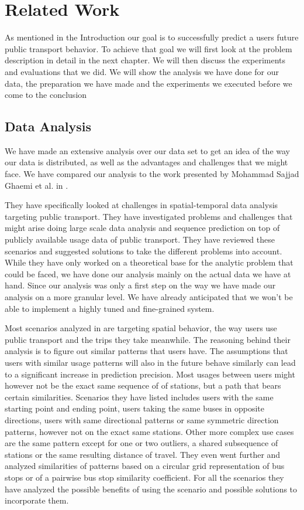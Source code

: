 \newpage
\chapter{Related Work}

As mentioned in the Introduction our goal is to successfully predict a users future public transport behavior. To achieve that goal we will first look at the problem description in detail in the next chapter. We will then discuss the experiments and evaluations that we did. We will show the analysis we have done for our data, the preparation we have made and the experiments we executed before we come to the conclusion

\section{Data Analysis}
We have made an extensive analysis over our data set to get an idea of the way our data is distributed, as well as the advantages and challenges that we might face. We have compared our analysis to the work presented by Mohammad Sajjad Ghaemi et al. in \cite{RelatedWorkDataAnalysis}. 

They have specifically looked at challenges in spatial-temporal data analysis targeting public transport. They have investigated problems and challenges that might arise doing large scale data analysis and sequence prediction on top of publicly available usage data of public transport. They have reviewed these scenarios and suggested solutions to take the different problems into account. While they have only worked on a theoretical base for the analytic problem that could be faced, we have done our analysis mainly on the actual data we have at hand. Since our analysis was only a first step on the way we have made our analysis on a more granular level. We have already anticipated that we won't be able to implement a highly tuned and fine-grained system. 

Most scenarios analyzed in \cite{RelatedWorkDataAnalysis} are targeting spatial behavior, the way users use public transport and the trips they take meanwhile. The reasoning behind their analysis is to figure out similar patterns that users have. The assumptions that users with similar usage patterns will also in the future behave similarly can lead to a significant increase in prediction precision. Most usages between users might however not be the exact same sequence of of stations, but a path that bears certain similarities. Scenarios they have listed includes users with the same starting point and ending point, users taking the same buses in opposite directions, users with same directional patterns or same symmetric direction patterns, however not on the exact same stations. Other more complex use cases are the same pattern except for one or two outliers, a shared subsequence of stations or the same resulting distance of travel. They even went further and analyzed similarities of patterns based on a circular grid representation of bus stops or of a pairwise bus stop similarity coefficient. For all the scenarios they have analyzed the possible benefits of using the scenario and possible solutions to incorporate them. 

